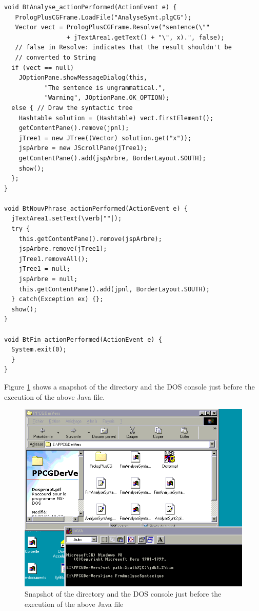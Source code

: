 \documentclass{book}
\begin{document}
\begin{verbatim}
void BtAnalyse_actionPerformed(ActionEvent e) {
   PrologPlusCGFrame.LoadFile("AnalyseSynt.plgCG");
   Vector vect = PrologPlusCGFrame.Resolve("sentence(\""
                 + jTextArea1.getText() + "\", x).", false);
   // false in Resolve: indicates that the result shouldn't be 
   // converted to String
  if (vect == null)
    JOptionPane.showMessageDialog(this, 
           "The sentence is ungrammatical.", 
           "Warning", JOptionPane.OK_OPTION);
  else { // Draw the syntactic tree
    Hashtable solution = (Hashtable) vect.firstElement();
    getContentPane().remove(jpnl);
    jTree1 = new JTree((Vector) solution.get("x"));
    jspArbre = new JScrollPane(jTree1);
    getContentPane().add(jspArbre, BorderLayout.SOUTH);
    show();
  };
}

void BtNouvPhrase_actionPerformed(ActionEvent e) { 
  jTextArea1.setText(\verb|""|);
  try {
    this.getContentPane().remove(jspArbre);
    jspArbre.remove(jTree1);
    jTree1.removeAll();
    jTree1 = null;
    jspArbre = null;
    this.getContentPane().add(jpnl, BorderLayout.SOUTH);
  } catch(Exception ex) {};
  show();
}

void BtFin_actionPerformed(ActionEvent e) {
  System.exit(0);
  }
}
\end{verbatim}


Figure \ref{AppelAnalSynt} shows a snapshot of the directory and the
DOS console just before the execution of the above Java file.

\begin{latexonly}

\begin{figure}
\begin{center}
\includegraphics[scale=0.4]{AppelAnalSynt.png}
\end{center}
\caption{\label{AppelAnalSynt}Snapshot of the directory and the DOS
console just before the execution of the above Java file}
\end{figure}

\end{latexonly}
\end{document}
